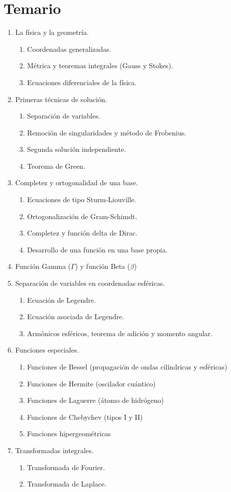 \documentclass[12pt]{article}
\begin{document}
\section{Temario}
\begin{enumerate}
\item La física y la geometría.
\begin{enumerate}
\item Coordenadas generalizadas.
\item Métrica y teoremas integrales (Gauss y Stokes).
\item Ecuaciones diferenciales de la física.
\end{enumerate}
\item Primeras técnicas de solución.
\begin{enumerate}
\item Separación de variables.
\item Remoción de singularidades y método de Frobenius.
\item Segunda solución independiente.
\item Teorema de Green.
\end{enumerate}
\item Completez y ortogonalidad de una base.
\begin{enumerate}
\item Ecuaciones de tipo Sturm-Liouville.
\item Ortogonalización de Gram-Schimdt.
\item Completez y función delta de Dirac.
\item Desarrollo de una función en una base propia.
\end{enumerate}
\item Función Gamma ($\Gamma$) y función Beta ($\beta$)
\item Separación de variables en coordenadas esféricas.
\begin{enumerate}
\item Ecuación de Legendre.
\item Ecuación asociada de Legendre.
\item Armónicos esféricos, teorema de adición y momento angular.
\end{enumerate}
\item Funciones especiales.
\begin{enumerate}
\item Funciones de Bessel (propagación de ondas cilíndricas y esféricas)
\item Funciones de Hermite (oscilador cuántico)
\item Funciones de Laguerre (átomo de hidrógeno)
\item Funciones de Chebychev (tipos I y II)
\item Funciones hipergeométricas
\end{enumerate}
\item Transformadas integrales.
\begin{enumerate}
\item Transformada de Fourier.
\item Transformada de Laplace.
\end{enumerate}
\end{enumerate}
\end{document}
